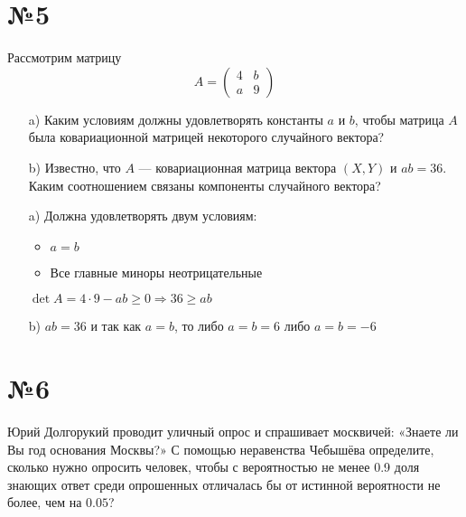\documentclass{article}
\begin{document}
\newpage
\section*{№5}
\begin{tcolorbox}[colback=blue!20!white, colframe=black!100!black]
    Рассмотрим матрицу
    \begin{equation*}
        A=\begin{pmatrix}
            4&b\\
            a&9
        \end{pmatrix}
    \end{equation*}
    \begin{itemize}
        \item[a)] Каким условиям должны удовлетворять константы $a$ и $b$, чтобы матрица $A$ была ковариационной матрицей некоторого случайного вектора?
        \item[b)] Известно, что $A$ — ковариационная матрица вектора $(X, Y)$ и $a b=36$. Каким соотношением связаны компоненты случайного вектора? 
    \end{itemize}
\end{tcolorbox}

\begin{enumerate}
    \item[a)] Должна удовлетворять двум условиям:
    \begin{itemize}
        \item $a=b$
        \item Все главные миноры неотрицательные
    \end{itemize}
    $\det A=4\cdot9-ab\geqslant0\Longrightarrow 36\geqslant ab$

    \item[b)] $ab=36$ и так как $a=b$, то либо $a=b=6$ либо $a=b=-6$
\end{enumerate}




\newpage
\section*{№6}
\begin{tcolorbox}[colback=blue!20!white, colframe=black!100!black]
    Юрий Долгорукий проводит уличный опрос и спрашивает москвичей: «Знаете ли Вы год основания Москвы?» С помощью неравенства Чебышёва определите, сколько нужно опросить человек, чтобы с вероятностью не менее 0.9 доля знающих ответ среди опрошенных отличалась бы от истинной вероятности не более, чем на $0.05$?
\end{tcolorbox}
\end{document}
